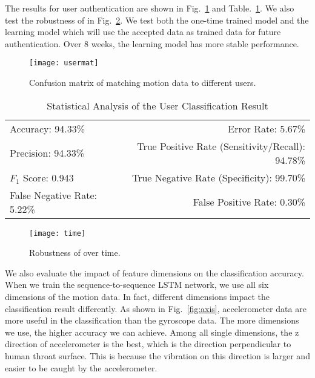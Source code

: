 The results for user authentication are shown in Fig.~\ref{fig:usermat} and Table.~\ref{tab:userTable}. We also test the robustness of {\shortname} in Fig.~\ref{fig:time}. We test both the one-time trained model and the learning model which will use the accepted data as trained data for future authentication. Over 8 weeks, the learning model has more stable performance.
\begin{figure}[h]
	\centering
	\texttt{[image: usermat]}
	\caption{Confusion matrix of matching motion data to different users.}
	\label{fig:usermat}
\end{figure}
\begin{table}[t]
	\caption{Statistical Analysis of the User Classification Result}
	\label{tab:userTable}
	\centering
	\begin{tabular}{lr}
		\toprule
		Accuracy: 94.33\% & \hspace{-.55in} Error Rate: 5.67\% \\
		Precision: 94.33\% & \hspace{-.55in} True Positive Rate (Sensitivity/Recall): 94.78\% \\
		$F_1$ Score: 0.943 & \hspace{-.55in} True Negative Rate (Specificity): 99.70\% \\
		False Negative Rate: 5.22\%  & \hspace{-.55in} False Positive Rate: 0.30\% \\
		\bottomrule
	\end{tabular}
\end{table}
\begin{figure}[h]
	\centering
	\texttt{[image: time]}
	\caption{Robustness of {\shortname} over time.}
	\label{fig:time}
\end{figure}



We also evaluate the impact of feature dimensions on the classification accuracy. When we train the sequence-to-sequence LSTM network, we use all six dimensions of the motion data. In fact, different dimensions impact the classification result differently. As shown in Fig.~\ref{fig:axis}, accelerometer data are more useful in the classification than the gyroscope data. The more dimensions we use, the higher accuracy we can achieve. Among all single dimensions, the z direction of accelerometer is the best, which is the direction perpendicular to human throat surface. This is because the vibration on this direction is larger and easier to be caught by the accelerometer.

